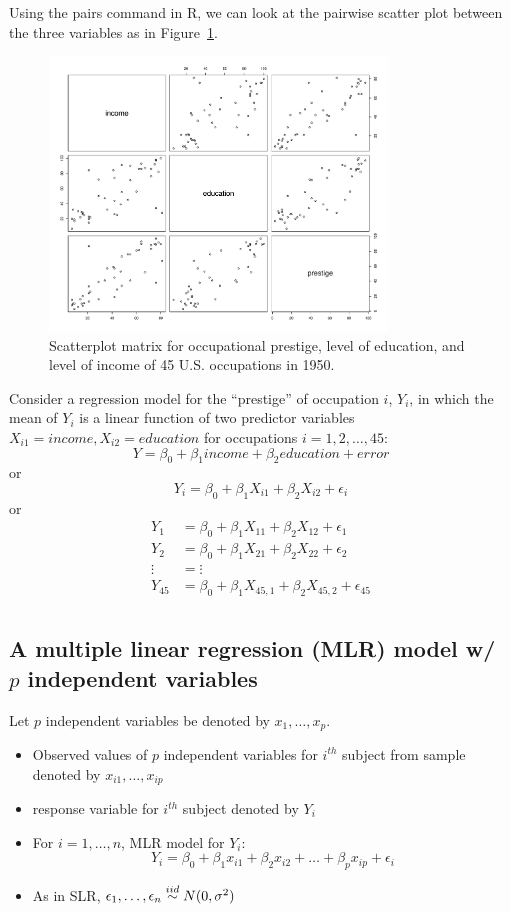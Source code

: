 Using the \colorbox{shadecolor}{pairs} command in R, we can look at the pairwise scatter plot between the three variables as in Figure~\ref{fig:duncan_pair}.
\begin{figure}[H]
\begin{center}
  \includegraphics[width=0.8\textwidth]{Lecture9/Duncan_pairs.pdf}
  \caption{Scatterplot matrix for occupational prestige, level of education, and level of income of 45 U.S. occupations in 1950.}
  \label{fig:duncan_pair}
\end{center}
\end{figure}

Consider a regression model for the ``prestige'' of occupation $i$, $Y_i$, in which the mean of $Y_i$ is a linear function of two predictor variables $X_{i1} = income, X_{i2} = education$ for occupations $i = 1, 2,\dots, 45$:
$$
Y = \beta_0 + \beta_1 income + \beta_2 education + error
$$
or
$$
Y_i = \beta_0 + \beta_1 X_{i1} + \beta_2 X_{i2} + \epsilon_i
$$
or
$$
\begin{aligned}
Y_1 &= \beta_0 + \beta_1 X_{11} + \beta_2 X_{12} + \epsilon_1\\
Y_2 &= \beta_0 + \beta_1 X_{21} + \beta_2 X_{22} + \epsilon_2\\
\vdots &= \vdots\\
Y_{45} &= \beta_0 + \beta_1 X_{45,1} + \beta_2 X_{45,2} + \epsilon_{45}\\
\end{aligned}
$$

\subsection*{A multiple linear regression (MLR) model w/ $p$ independent variables}
Let $p$ independent variables be denoted by $x_1, \dots, x_p$.
\begin{itemize}
  \item Observed values of $p$ independent variables for $i^{th}$ subject from sample denoted by $x_{i1}, \dots, x_{ip}$
  \item response variable for $i^{th}$ subject denoted by $Y_i$
  \item For $i = 1, \dots, n$, MLR model for $Y_i$:
  $$
  Y_i = \beta_0 + \beta_1 x_{i1} + \beta_2 x_{i2} + \dots + \beta_p x_{ip} + \epsilon_i
  $$
  \item As in SLR, $\epsilon_1, \dots, \epsilon_n \overset{iid}{\sim} N(0, \sigma^2)$
\end{itemize}

